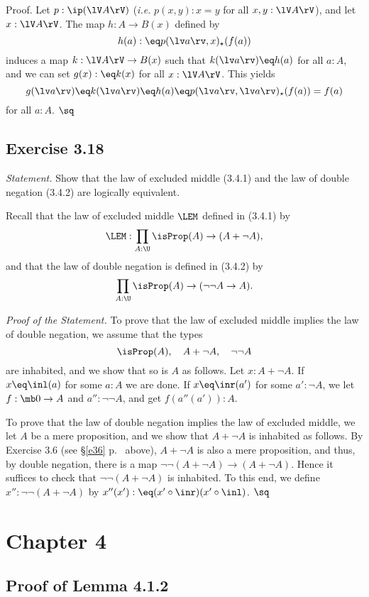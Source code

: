 \documentclass[12pt]{article}
\begin{document}
Proof. Let $p:\ip(\lV A\rV)$ (\emph{i.e.} $p(x,y):x=y$ for all $x,y:\lV A\rV$), and let $x:\lV A\rV$. The map $h:A\to B(x)$ defined by 
$$
h(a):\eq p(\lv a\rv,x)_\star(f(a))
$$ 
induces a map $k:\lV A\rV\to B(x)$ such that $k(\lv a\rv)\eq h(a)$ for all $a:A$, and we can set $g(x):\eq k(x)$ for all $x:\lV A\rV$. This yields 
$$
g(\lv a\rv)\eq k(\lv a\rv)\eq h(a)\eq p(\lv a\rv,\lv a\rv)_\star(f(a))=f(a)
$$ 
for all $a:A$. $\sq$


\subsection{Exercise 3.18}

\emph{Statement.} Show that the law of excluded middle (3.4.1) and the law of double negation (3.4.2) are logically equivalent.

Recall that the law of excluded middle $\LEM$ defined in (3.4.1) by 
$$
\LEM:\prod_{A:\U}\isProp(A)\to(A+\neg A),
$$ 
and that the law of double negation is defined in (3.4.2) by 
$$
\prod_{A:\U}\isProp(A)\to(\neg\neg A\to A).
$$ 

\nn\emph{Proof of the Statement.} To prove that the law of excluded middle implies the law of double negation, we assume that the types 
$$
\isProp(A),\quad A+\neg A,\quad \neg\neg A
$$ 
are inhabited, and we show that so is $A$ as follows. Let $x:A+\neg A$. If $x\eq\inl(a)$ for some $a:A$ we are done. If $x\eq\inr(a')$ for some $a':\neg A$, we let $f:\mb0\to A$ and $a'':\neg\neg A$, and get $f(a''(a')):A$. 

To prove that the law of double negation implies the law of excluded middle, we let $A$ be a mere proposition, and we show that $A+\neg A$ is inhabited as follows. By Exercise 3.6 (see \S\ref{e36} p.~\pageref{e36} above), $A+\neg A$ is also a mere proposition, and thus, by double negation, there is a map $\neg\neg(A+\neg A)\to(A+\neg A)$. Hence it suffices to check that $\neg\neg(A+\neg A)$ is inhabited. To this end, we define $x'':\neg\neg(A+\neg A)$ by $x''(x'):\eq(x'\circ\inr)(x'\circ\inl)$. $\sq$


\section{Chapter 4}

\subsection{Proof of Lemma 4.1.2}
\end{document}

